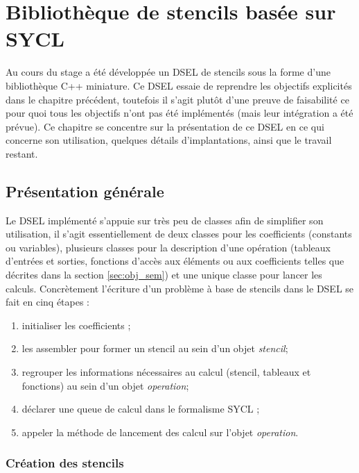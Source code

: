 
\chapter{Bibliothèque de stencils basée sur \textsf{SYCL}}

Au cours du stage a été développée un DSEL de stencils sous la forme d'une bibliothèque \textsf{C++} miniature. Ce DSEL essaie de reprendre les objectifs explicités dans le chapitre précédent, toutefois il s'agit plutôt d'une preuve de faisabilité ce pour quoi tous les objectifs n'ont pas été implémentés (mais leur intégration a été prévue). Ce chapitre se concentre sur la présentation de ce DSEL en ce qui concerne son utilisation, quelques détails d'implantations, ainsi que le travail restant.

\section{Présentation générale}

Le DSEL implémenté s'appuie sur très peu de classes afin de simplifier son utilisation, il s'agit essentiellement de deux classes pour les coefficients (constants ou variables), plusieurs classes pour la description d'une opération (tableaux d'entrées et sorties, fonctions d'accès aux éléments ou aux coefficients telles que décrites dans la section \ref{sec:obj_sem}) et une unique classe pour lancer les calculs. Concrètement l'écriture d'un problème à base de stencils dans le DSEL se fait en cinq étapes :

\begin{enumerate}
\item initialiser les coefficients ;
\item les assembler pour former un stencil au sein d'un objet \emph{stencil};
\item regrouper les informations nécessaires au calcul (stencil, tableaux et fonctions) au sein d'un objet \emph{operation};
\item déclarer une queue de calcul dans le formalisme \textsf{SYCL} ;
\item appeler la méthode de lancement des calcul sur l'objet \emph{operation}.
\end{enumerate}

\subsection{Création des stencils}


